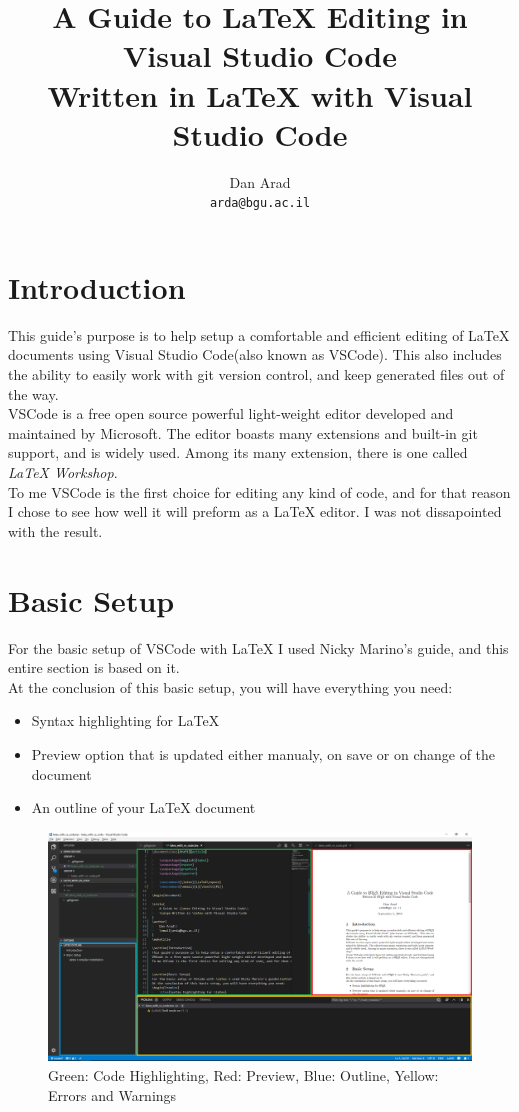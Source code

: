 \documentclass{article}
\newcommand{\latex}{\LaTeX\xspace}
\newcommand{\email}[1]{\texttt{#1}}
\begin{document}
\title{
	A Guide to \latex Editing in Visual Studio Code\\
	\large Written in \latex with Visual Studio Code
}
\author{
	Dan Arad\\
	\email{arda@bgu.ac.il}
}
\maketitle

\section{Introduction}
This guide's purpose is to help setup a comfortable and efficient editing of \latex documents using Visual Studio Code\footnotemark[1] (also known as VSCode). This also includes the ability to easily work with git version control, and keep generated files out of the way.\\
VSCode is a free open source powerful light-weight editor developed and maintained by Microsoft. The editor boasts many extensions and built-in git support, and is widely used. Among its many extension, there is one called \emph{LaTeX Workshop}\footnotemark[2].\\
To me VSCode is the first choice for editing any kind of code, and for that reason I chose to see how well it will preform as a \latex editor. I was not dissapointed with the result.


\section{Basic Setup}
For the basic setup of VSCode with \latex I used Nicky Marino's guide\footnotemark[3], and this entire section is based on it.\\
At the conclusion of this basic setup, you will have everything you need:
\begin{itemize}
	\item{Syntax highlighting for \latex}
	\item{Preview option that is updated either manualy, on save or on change of the document}
	\item{An outline of your \latex document}
\end{itemize}
\begin{figure}[h!]
	\includegraphics[width=\linewidth]{../resources/vscode_with_latex_highlights.png}
	\caption{Green: Code Highlighting, Red: Preview, Blue: Outline, Yellow: Errors and Warnings}
	\label{fig:vscode_with_latex_highlights}
\end{figure}
\end{document}
